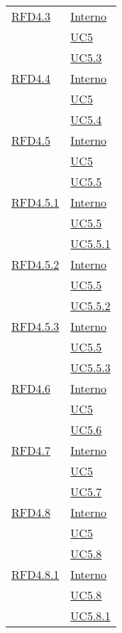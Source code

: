 \begin{longtable}{|>{\centering}m{5cm}|m{5cm}<{\centering}|}
\hyperlink{RFD4.3}{RFD4.3} & \hyperlink{Interno}{Interno}\\
& \hyperref[UC5]{UC5}\\
& \hyperref[UC5.3]{UC5.3}\\ \hline

\hyperlink{RFD4.4}{RFD4.4} & \hyperlink{Interno}{Interno}\\
& \hyperref[UC5]{UC5}\\
& \hyperref[UC5.4]{UC5.4}\\ \hline

\hyperlink{RFD4.5}{RFD4.5} & \hyperlink{Interno}{Interno}\\
& \hyperref[UC5]{UC5}\\
& \hyperref[UC5.5]{UC5.5}\\ \hline

\hyperlink{RFD4.5.1}{RFD4.5.1} & \hyperlink{Interno}{Interno}\\
& \hyperref[UC5.5]{UC5.5}\\
& \hyperref[UC5.5.1]{UC5.5.1}\\ \hline

\hyperlink{RFD4.5.2}{RFD4.5.2} & \hyperlink{Interno}{Interno}\\
& \hyperref[UC5.5]{UC5.5}\\
& \hyperref[UC5.5.2]{UC5.5.2}\\ \hline

\hyperlink{RFD4.5.3}{RFD4.5.3} & \hyperlink{Interno}{Interno}\\
& \hyperref[UC5.5]{UC5.5}\\
& \hyperref[UC5.5.3]{UC5.5.3}\\ \hline

\hyperlink{RFD4.6}{RFD4.6} & \hyperlink{Interno}{Interno}\\
& \hyperref[UC5]{UC5}\\
& \hyperref[UC5.6]{UC5.6}\\ \hline

\hyperlink{RFD4.7}{RFD4.7} & \hyperlink{Interno}{Interno}\\
& \hyperref[UC5]{UC5}\\
& \hyperref[UC5.7]{UC5.7}\\ \hline

\hyperlink{RFD4.8}{RFD4.8} & \hyperlink{Interno}{Interno}\\
& \hyperref[UC5]{UC5}\\
& \hyperref[UC5.8]{UC5.8}\\ \hline

\hyperlink{RFD4.8.1}{RFD4.8.1} & \hyperlink{Interno}{Interno}\\
& \hyperref[UC5.8]{UC5.8}\\
& \hyperref[UC5.8.1]{UC5.8.1}\\ \hline


\end{longtable}
